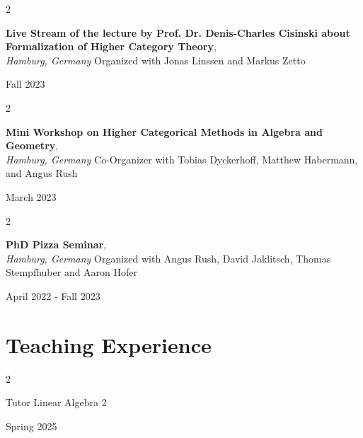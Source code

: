 \documentclass[10pt, letterpaper]{article}
\newenvironment{twocolentry}[2][]{
    \onecolentry
    \def\secondColumn{#2}
    \setcolumnwidth{\fill, 4.5 cm}
    \begin{paracol}{2}
}{
    \switchcolumn \raggedleft \secondColumn
    \end{paracol}
    \endonecolentry
} %
\begin{document}
\begin{twocolentry}{

    Fall 2023
           
        }
            \textbf{Live Stream of the lecture by Prof. Dr. Denis-Charles Cisinski about Formalization of Higher Category Theory}, \\
            \textit{Hamburg, Germany} Organized with Jonas Linssen and Markus Zetto
            
           
        \end{twocolentry}
        
 \vspace{0.2cm}

  \begin{twocolentry}{

    March 2023
           
        }
            \textbf{Mini Workshop on Higher Categorical Methods in Algebra and Geometry}, \\
            \textit{Hamburg, Germany} Co-Organizer with Tobias Dyckerhoff, Matthew Habermann, and Angus Rush
            
           
        \end{twocolentry}
        
 \vspace{0.2cm} 

\begin{twocolentry}{

    April 2022 - Fall 2023
           
        }
            \textbf{PhD Pizza Seminar}, \\
            \textit{Hamburg, Germany} Organized with Angus Rush, David Jaklitsch, Thomas Stempfhuber and Aaron Hofer
            
           
        \end{twocolentry}
        
 \vspace{0.2cm}


 
\section{Teaching Experience}

\begin{twocolentry}
    {Spring 2025}
    Tutor Linear Algebra 2
    
\end{twocolentry}
\end{document}
